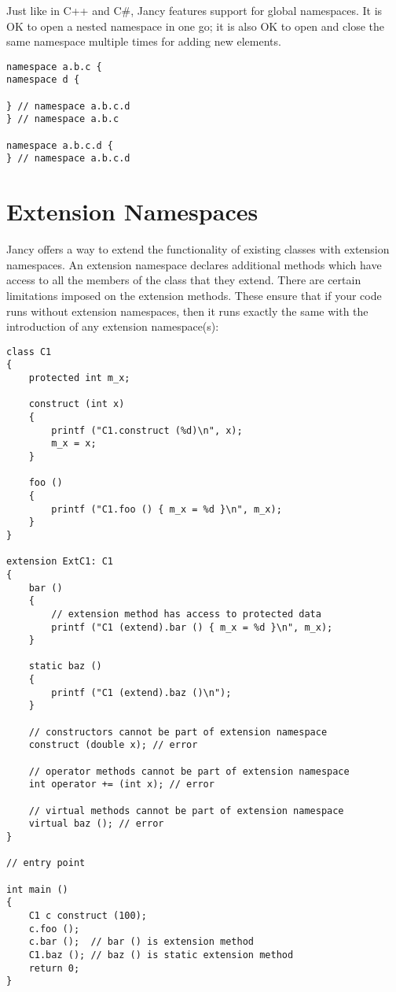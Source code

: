 \documentclass[oneside]{book}
\begin{document}
Just like in C++ and C\#, Jancy features support for global namespaces. It is OK to open a nested namespace in one go; it is also OK to open and close the same namespace multiple times for adding new elements.

\begin{lstlisting}
namespace a.b.c {
namespace d {

} // namespace a.b.c.d
} // namespace a.b.c 

namespace a.b.c.d {
} // namespace a.b.c.d 
\end{lstlisting}

\section{Extension Namespaces}
Jancy offers a way to extend the functionality of existing classes with extension namespaces. An extension namespace declares additional methods which have access to all the members of the class that they extend. There are certain limitations imposed on the extension methods. These ensure that if your code runs without extension namespaces, then it runs exactly the same with the introduction of any extension namespace(s):

\begin{lstlisting}
class C1
{
    protected int m_x;

    construct (int x)
    {
        printf ("C1.construct (%d)\n", x);
        m_x = x;
    }

    foo ()
    {
        printf ("C1.foo () { m_x = %d }\n", m_x);
    }
}

extension ExtC1: C1
{
    bar ()
    {
        // extension method has access to protected data
        printf ("C1 (extend).bar () { m_x = %d }\n", m_x); 
    }

    static baz ()
    {
        printf ("C1 (extend).baz ()\n");
    }

    // constructors cannot be part of extension namespace
    construct (double x); // error

    // operator methods cannot be part of extension namespace
    int operator += (int x); // error

    // virtual methods cannot be part of extension namespace
    virtual baz (); // error
}

// entry point

int main ()
{
    C1 c construct (100);
    c.foo ();            
    c.bar ();  // bar () is extension method
    C1.baz (); // baz () is static extension method
    return 0;
}
\end{lstlisting}
\end{document}
